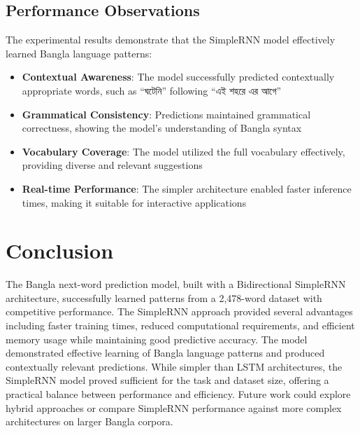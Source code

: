 \documentclass[12pt]{article}
\begin{document}
\subsection*{Performance Observations}
The experimental results demonstrate that the SimpleRNN model effectively learned Bangla language patterns:

\begin{itemize}
    \item \textbf{Contextual Awareness}: The model successfully predicted contextually appropriate words, such as {\bengalifont ``ঘটেনি''} following {\bengalifont ``এই শহরে এর আগে''}
    \item \textbf{Grammatical Consistency}: Predictions maintained grammatical correctness, showing the model's understanding of Bangla syntax
    \item \textbf{Vocabulary Coverage}: The model utilized the full vocabulary effectively, providing diverse and relevant suggestions
    \item \textbf{Real-time Performance}: The simpler architecture enabled faster inference times, making it suitable for interactive applications
\end{itemize}

\section*{Conclusion}
The Bangla next-word prediction model, built with a Bidirectional SimpleRNN architecture, successfully learned patterns from a 2,478-word dataset with competitive performance. The SimpleRNN approach provided several advantages including faster training times, reduced computational requirements, and efficient memory usage while maintaining good predictive accuracy. The model demonstrated effective learning of Bangla language patterns and produced contextually relevant predictions. While simpler than LSTM architectures, the SimpleRNN model proved sufficient for the task and dataset size, offering a practical balance between performance and efficiency. Future work could explore hybrid approaches or compare SimpleRNN performance against more complex architectures on larger Bangla corpora.
\end{document}
